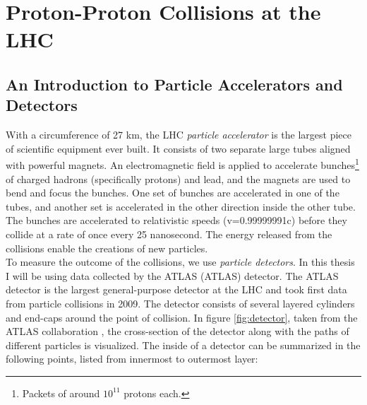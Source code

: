 \section{Proton-Proton Collisions at the LHC}
\subsection{An Introduction to Particle Accelerators and Detectors}\label{subsec:Detector}
With a circumference of 27 km, the \acf{LHC} \emph{particle accelerator} is the largest piece of scientific 
equipment ever built. It consists of two separate large tubes aligned with powerful magnets. An electromagnetic field is
applied to accelerate bunches\footnote{Packets of around $10^{11}$ protons each.} of charged hadrons (specifically protons) and lead,
and the magnets are used to bend and focus the bunches. One set of bunches are accelerated in one of the tubes, 
and another set is accelerated in the other direction inside the other tube. The bunches are accelerated to relativistic speeds
(v=0.99999991c) before they collide at a rate of once every 25 nanosecond. The energy released from 
the collisions enable the creations of new particles.
\\
To measure the outcome of the collisions, we use \emph{particle detectors}. In this thesis I will be using data collected by the 
\acs{ATLAS} (\acl{ATLAS}) detector. The \ac{ATLAS} detector is the largest general-purpose detector at the \ac{LHC}
and took first data from particle collisions in 2009. The detector consists of several layered cylinders and end-caps 
around the point of collision. In figure \ref{fig:detector}, taken from the \ac{ATLAS} collaboration \cite{PDetector}, the cross-section 
of the detector along with the paths of different particles is visualized. The inside of a detector can be summarized 
in the following points, listed from innermost to outermost layer:

